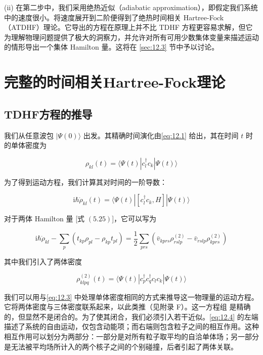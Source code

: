 (ii) 在第二步中，我们采用绝热近似（adiabatic approximation），即假定我们系统中的速度很小。将速度展开到二阶便得到了绝热时间相关
Hartree-Fock（ATDHF）理论。它导出的方程在原理上并不比 TDHF 方程更容易求解，但它为理解物理问题提供了极大的洞察力，并允许对所有可用少数集体变量来描述运动的情形导出一个集体
Hamilton 量。这将在 \ref{sec:12.3} 节中予以讨论。

\section{完整的时间相关Hartree-Fock理论\label{sec:12.2}}

\subsection{TDHF方程的推导\label{subsec:12.2.1}}

我们从任意波包 $|\Psi(0)\rangle$ 出发。其精确时间演化由\ref{eq:12.1} 给出，其在时间 $t$
时的单体密度为

\begin{equation}
\rho_{kl}(t)=\langle\Psi(t)|c^{\dagger}_{l}c_{k}|\Psi(t)\rangle\label{eq:12.2}
\end{equation}

为了得到运动方程，我们计算其对时间的一阶导数：

\begin{equation}
\mathrm{i}\hbar\dot{\rho}_{kl}(t)=\langle\Psi(t)|[c^{\dagger}_{l}c_{k},H]|\Psi(t)\rangle\label{eq:12.3}
\end{equation}

对于两体 Hamilton 量 {[}式 $(5.25)${]}，它可以写为

\begin{equation}
\mathrm{i}\hbar\dot{\rho}_{kl}-\sum_{p}(t_{kp}\rho_{pl}-\rho_{kp}t_{pl})=\frac{1}{2}\sum_{prs}(\bar{v}_{kprs}\rho^{(2)}_{rslp}-\bar{v}_{rslp}\rho^{(2)}_{kprs})\label{eq:12.4}
\end{equation}

其中我们引入了两体密度

\begin{equation}
\rho^{(2)}_{klpq}(t)=\langle\Psi(t)|c^{\dagger}_{p}c^{\dagger}_{q}c_{l}c_{k}|\Psi(t)\rangle\label{eq:12.5}
\end{equation}

我们可以用与\ref{eq:12.3} 中处理单体密度相同的方式来推导这一物理量的运动方程。它将两体密度与三体密度联系起来，以此类推（见附录
F）。这一方程组 \cite{BG49} 是精确的，但显然不是闭合的。为了使其闭合，我们必须引入若干近似。\ref{eq:12.4}
的左端描述了系统的自由运动，仅包含动能项；而右端则包含粒子之间的相互作用。这种相互作用可以划分为两部分：一部分是对所有粒子取平均的自洽单体场；另一部分是无法被平均场所计入的两个核子之间的个别碰撞，后者引起了两体关联。

